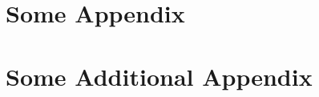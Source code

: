 \documentclass{thesis}
\begin{document}
\subappendix{}{%
    \label{chap4:app}
    
}




\begin{appendices}
    \chapter{Some Appendix}\label{app:a}
    
    \chapter{Some Additional Appendix}\label{app:b}
    
\end{appendices}
\end{document}
